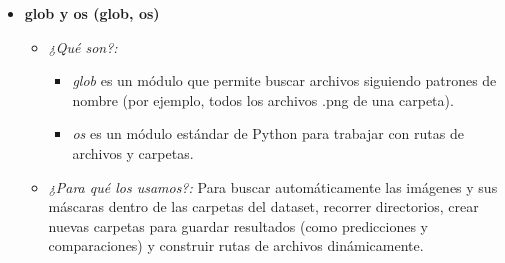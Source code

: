 \documentclass[12pt]{article}
\begin{document}
\begin{itemize}
    \item \textbf{glob y os (glob, os)} \cite{glob}
    \cite{os}
    \begin{itemize}
        \item \textit{¿Qué son?:}
        \begin{itemize}
            \item \textit{glob} es un módulo que permite buscar archivos siguiendo patrones de nombre (por ejemplo, todos los archivos .png de una carpeta).
            \item \textit{os} es un módulo estándar de Python para trabajar con rutas de archivos y carpetas.
        \end{itemize}
        \item \textit{¿Para qué los usamos?:} Para buscar automáticamente las imágenes y sus máscaras dentro de las carpetas del dataset, recorrer directorios, crear nuevas carpetas para guardar resultados (como predicciones y comparaciones) y construir rutas de archivos dinámicamente.
    \end{itemize}


\end{itemize}
\end{document}

